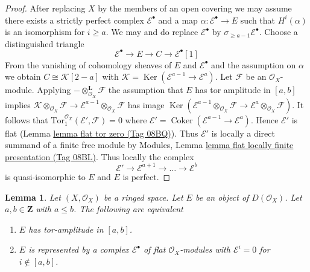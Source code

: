 \documentclass{amsart}
\theoremstyle{plain}
\newtheorem{lemma}[subsection]{Lemma}
\theoremstyle{definition}
\theoremstyle{remark}
\numberwithin{equation}{subsection}
\def\Ker{\mathop{\mathrm{Ker}}}
\def\Coker{\mathop{\mathrm{Coker}}}
\begin{document}
\begin{proof}
After replacing $X$ by the members of an open covering we may assume there
exists a strictly perfect complex $\mathcal{E}^\bullet$ and a map
$\alpha : \mathcal{E}^\bullet \to E$ such that $H^i(\alpha)$ is an isomorphism
for $i \geq a$. We may and do replace $\mathcal{E}^\bullet$ by
$\sigma_{\geq a - 1}\mathcal{E}^\bullet$. Choose a distinguished triangle
$$
\mathcal{E}^\bullet \to E \to C \to \mathcal{E}^\bullet[1]
$$
From the vanishing of cohomology sheaves of $E$ and $\mathcal{E}^\bullet$
and the assumption on $\alpha$ we obtain $C \cong \mathcal{K}[2 - a]$ with
$\mathcal{K} = \Ker(\mathcal{E}^{a - 1} \to \mathcal{E}^a)$.
Let $\mathcal{F}$ be an $\mathcal{O}_X$-module.
Applying $- \otimes_{\mathcal{O}_X}^\mathbf{L} \mathcal{F}$
the assumption that $E$ has tor amplitude in $[a, b]$
implies $\mathcal{K} \otimes_{\mathcal{O}_X} \mathcal{F} \to
\mathcal{E}^{a - 1} \otimes_{\mathcal{O}_X} \mathcal{F}$ has image
$\Ker(\mathcal{E}^{a - 1} \otimes_{\mathcal{O}_X} \mathcal{F}
\to \mathcal{E}^a \otimes_{\mathcal{O}_X} \mathcal{F})$.
It follows that $\text{Tor}_1^{\mathcal{O}_X}(\mathcal{E}', \mathcal{F}) = 0$
where $\mathcal{E}' = \Coker(\mathcal{E}^{a - 1} \to \mathcal{E}^a)$.
Hence $\mathcal{E}'$ is flat (Lemma \href{https://stacks.math.columbia.edu/tag/08BQ}{lemma flat tor zero (Tag 08BQ)}).
Thus $\mathcal{E}'$ is locally a direct summand of a finite free module by
Modules, Lemma \href{https://stacks.math.columbia.edu/tag/08BL}{lemma flat locally finite presentation (Tag 08BL)}.
Thus locally the complex
$$
\mathcal{E}' \to \mathcal{E}^{a + 1} \to \ldots \to \mathcal{E}^b
$$
is quasi-isomorphic to $E$ and $E$ is perfect.
\end{proof}


\begin{lemma}
\label{cohomology-lemma-tor-amplitude}
Let $(X, \mathcal{O}_X)$ be a ringed space.
Let $E$ be an object of $D(\mathcal{O}_X)$.
Let $a, b \in \mathbf{Z}$ with $a \leq b$. The following are equivalent
\begin{enumerate}
\item $E$ has tor-amplitude in $[a, b]$.
\item $E$ is represented by a complex
$\mathcal{E}^\bullet$ of flat $\mathcal{O}_X$-modules with
$\mathcal{E}^i = 0$ for $i \not \in [a, b]$.
\end{enumerate}
\end{lemma}
\end{document}
